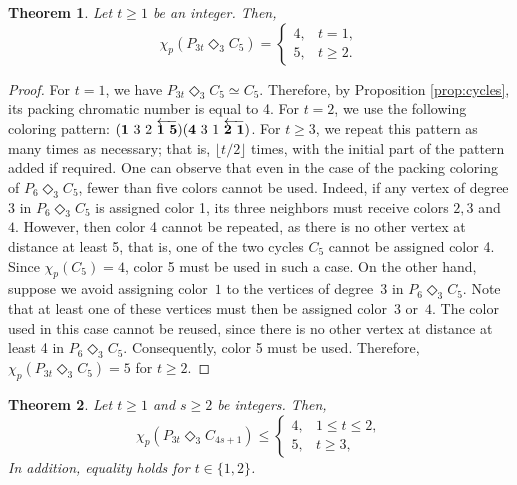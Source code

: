 \documentclass{article}
\newtheorem{theorem}{Theorem}
\begin{document}
\begin{theorem} Let $t\geq 1$ be an integer. Then,
 $$\chi_p(P_{3t}\Diamond_3 C_5)=\left\{
\begin{array}{ll}
4, & t=1,\\
5, & t \geq 2.
\end{array}\right.
$$
\label{thm:l3C5}
\end{theorem}
\begin{proof}
For $t=1$, we have $P_{3t}\Diamond_3 C_{5} \simeq C_5$. Therefore, by Proposition \ref{prop:cycles}, its packing chromatic number is equal to 4. For $t=2$, we use the following coloring pattern: $({\bf 1}\ 3\ 2\ \overleftarrow{{\bf 1\ 5}})({\bf 4}\ 3\ 1\ \overleftarrow{{\bf 2\ 1}})$. For $t \geq 3$, we repeat this pattern as many times as necessary; that is,  $\lfloor t/2 \rfloor$ times, with the initial part of the pattern added if required. One can observe that even in the case of the packing coloring of $P_6 \Diamond_3 C_5$, fewer than five colors cannot be used. Indeed, if any vertex of degree 3 in $P_6 \Diamond_3 C_5$ is assigned color 1, its three neighbors must receive colors $2,3$ and $4$. However, then color 4 cannot be repeated, as there is no other vertex at distance at least 5, that is, one of the two cycles $C_5$ cannot be assigned color 4.  Since $\chi_p(C_5)=4$, color 5 must be used in such a case. On the other hand, suppose we avoid assigning color~$1$ to the vertices of degree~$3$ in $P_6 \Diamond_3 C_5$. Note that at least one of these vertices must then be assigned color~$3$ or~$4$. The color used in this case cannot be reused, since there is no other vertex at distance at least 4 in $P_6 \Diamond_3 C_5$. Consequently, color 5 must be used. Therefore, $\chi_p(P_{3t} \Diamond_3 C_5)=5$ for $t \geq 2$.
\end{proof}
\begin{theorem}
    Let $t \geq 1$ and $s\geq 2$ be integers. Then, 
  $$\chi_p(P_{3t}\Diamond_3 C_{4s+1})\leq\left\{
\begin{array}{ll}
4, & 1 \leq t \leq 2,\\
5, & t \geq 3,
\end{array}\right.
$$  
In addition, equality holds for $t \in \{1,2\}$.
\label{thm:l3C4s+1}
\end{theorem}
\end{document}
